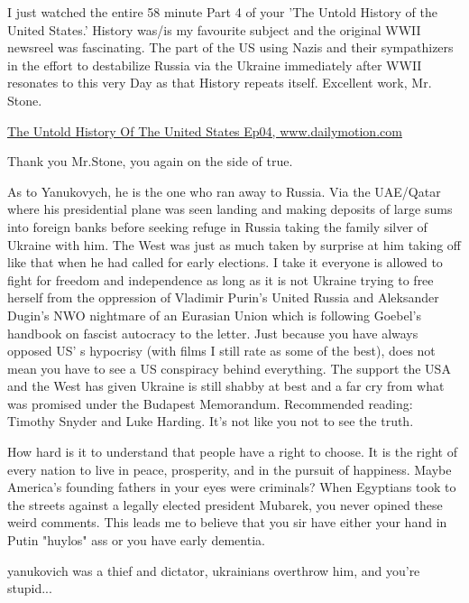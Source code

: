 \begin{itemize}

I just watched the entire 58 minute Part 4 of your 'The Untold History of the
United States.' History was/is my favourite subject and the original WWII
newsreel was fascinating. The part of the US using Nazis and their sympathizers
in the effort to destabilize Russia via the Ukraine immediately after WWII
resonates to this very Day as that History repeats itself. Excellent work, Mr.
Stone.

\href{https://www.dailymotion.com/video/xzqzf4}{%
The Untold History Of The United States Ep04, www.dailymotion.com%
}


Thank you Mr.Stone, you again on the side of true.


As to Yanukovych, he is the one who ran away to Russia. Via the UAE/Qatar where
his presidential plane was seen landing and making deposits of large sums into
foreign banks before seeking refuge in Russia taking the family silver of
Ukraine with him. The West was just as much taken by surprise at him taking off
like that when he had called for early elections. I take it everyone is allowed
to fight for freedom and independence as long as it is not Ukraine trying to
free herself from the oppression of Vladimir Purin's United Russia and
Aleksander Dugin's NWO nightmare of an Eurasian Union which is following
Goebel's handbook on fascist autocracy to the letter. Just because you have
always opposed US' s hypocrisy (with films I still rate as some of the best),
does not mean you have to see a US conspiracy behind everything. The support
the USA and the West has given Ukraine is still shabby at best and a far cry
from what was promised under the Budapest Memorandum. Recommended reading:
Timothy Snyder and Luke Harding. It's not like you not to see the truth.


How hard is it to understand that people have a right to choose. It is the
right of every nation to live in peace, prosperity, and in the pursuit of
happiness. Maybe America's founding fathers in your eyes were criminals? When
Egyptians took to the streets against a legally elected president Mubarek, you
never opined these weird comments. This leads me to believe that you sir have
either your hand in Putin "huylos" ass or you have early dementia.


yanukovich was a thief and dictator, ukrainians overthrow him, and you're stupid...


\end{itemize}
